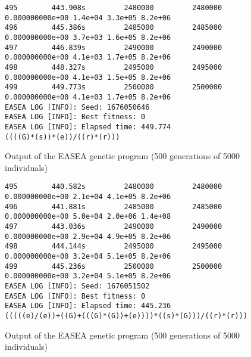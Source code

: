 \begin{figure}
    \begin{lstlisting}
495        443.908s         2480000         2480000 0.000000000e+00 1.4e+04 3.3e+05 8.2e+06
496        445.386s         2485000         2485000 0.000000000e+00 3.7e+03 1.6e+05 8.2e+06
497        446.839s         2490000         2490000 0.000000000e+00 4.1e+03 1.7e+05 8.2e+06
498        448.327s         2495000         2495000 0.000000000e+00 4.1e+03 1.5e+05 8.2e+06
499        449.773s         2500000         2500000 0.000000000e+00 4.1e+03 1.7e+05 8.2e+06
EASEA LOG [INFO]: Seed: 1676050646
EASEA LOG [INFO]: Best fitness: 0
EASEA LOG [INFO]: Elapsed time: 449.774
((((G)*(s))*(e))/((r)*(r)))
\end{lstlisting}
    \caption{Output of the EASEA genetic program (500 generations of 5000
        individuals)}
    \label{gp_1}
\end{figure}

\begin{figure}
    \begin{lstlisting}
495        440.582s         2480000         2480000 0.000000000e+00 2.1e+04 4.1e+05 8.2e+06
496        441.881s         2485000         2485000 0.000000000e+00 5.0e+04 2.0e+06 1.4e+08
497        443.036s         2490000         2490000 0.000000000e+00 2.9e+04 4.9e+05 8.2e+06
498        444.144s         2495000         2495000 0.000000000e+00 3.2e+04 5.1e+05 8.2e+06
499        445.236s         2500000         2500000 0.000000000e+00 3.2e+04 5.1e+05 8.2e+06
EASEA LOG [INFO]: Seed: 1676051502
EASEA LOG [INFO]: Best fitness: 0
EASEA LOG [INFO]: Elapsed time: 445.236
(((((e)/(e))+((G)+(((G)*(G))+(e))))*((s)*(G)))/((r)*(r)))
\end{lstlisting}
    \caption{Output of the EASEA genetic program (500 generations of 5000
        individuals)}
    \label{gp_2}
\end{figure}



